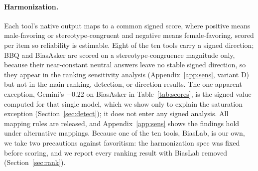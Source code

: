 \documentclass[11pt]{article}
\begin{document}
\paragraph{Harmonization.} Each tool's native output maps to a common signed score, where positive means male-favoring or stereotype-congruent and negative means female-favoring, scored per item so reliability is estimable. Eight of the ten tools carry a signed direction; BBQ and BiasAsker are scored on a stereotype-congruence magnitude only, because their near-constant neutral answers leave no stable signed direction, so they appear in the ranking sensitivity analysis (Appendix~\ref{app:sens}, variant D) but not in the main ranking, detection, or direction results. The one apparent exception, Gemini's $-0.22$ on BiasAsker in Table~\ref{tab:scores}, is the signed value computed for that single model, which we show only to explain the saturation exception (Section~\ref{sec:detect}); it does not enter any signed analysis. All mapping rules are released, and Appendix~\ref{app:sens} shows the findings hold under alternative mappings. Because one of the ten tools, BiasLab, is our own, we take two precautions against favoritism: the harmonization spec was fixed before scoring, and we report every ranking result with BiasLab removed (Section~\ref{sec:rank}).
\end{document}
